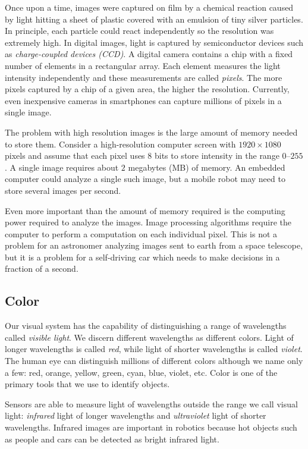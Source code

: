 Once upon a time, images were captured on film by a chemical reaction caused by light hitting a sheet of plastic covered with an emulsion of tiny silver particles. In principle, each particle could react independently so the resolution was extremely high. In digital images, light is captured by semiconductor devices such as \emph{charge-coupled devices (CCD)}. A digital camera contains a chip with a fixed number of elements in a rectangular array. Each element measures the light intensity independently and these measurements are called \emph{pixels}. The more pixels captured by a chip of a given area, the higher the resolution. Currently, even inexpensive cameras in smartphones can capture millions of pixels in a single image.

The problem with high resolution images is the large amount of memory needed to store them. Consider a high-resolution computer screen with $1920\times 1080$ pixels and assume that each pixel uses $8$ bits to store intensity in the range $0$--$255$. A single image requires about $2$ megabytes (MB) of memory. An embedded computer could analyze a single such image, but a mobile robot may need to store several images per second.

Even more important than the amount of memory required is the computing power required to analyze the images. Image processing algorithms require the computer to perform a computation on each individual pixel. This is not a problem for an astronomer analyzing images sent to earth from a space telescope, but it is a problem for a self-driving car which needs to make decisions in a fraction of a second.

\subsection*{Color}

Our visual system has the capability of distinguishing a range of wavelengths called \emph{visible light}. We discern different wavelengths as different colors. Light of longer wavelengths is called \emph{red}, while light of shorter wavelengths is called \emph{violet}. The human eye can distinguish millions of different colors although we name only a few: red, orange, yellow, green, cyan, blue, violet, etc. Color is one of the primary tools that we use to identify objects.

Sensors are able to measure light of wavelengths outside the range we call visual light: \emph{infrared} light of longer wavelengths and \emph{ultraviolet} light of shorter wavelengths. Infrared images are important in robotics because hot objects such as people and cars can be detected as bright infrared light.

